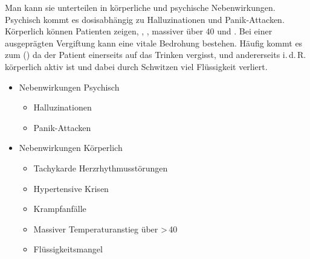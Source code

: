 \TextSlide{\TxSymptome}
{%
Man kann sie unterteilen in
körperliche und psychische Nebenwirkungen.
Psychisch kommt es dosisabhängig zu Halluzinationen und
Panik-Attacken.
Körperlich können Patienten  zeigen, ,
, massiver
 über 40\textdegree{} und
.
Bei einer ausgeprägten Vergiftung kann eine vitale Bedrohung
bestehen. Häufig kommt es zum
() da der
Patient einerseits auf das Trinken vergisst, und
andererseits i.\,d.\,R. körperlich aktiv ist und dabei durch
Schwitzen viel Flüssigkeit verliert.

\vspace{1.5cm}

}{
\begin{itemize}
  \item Nebenwirkungen Psychisch
  \begin{itemize}
    \item Halluzinationen
    \item Panik-Attacken
  \end{itemize}
  \item Nebenwirkungen Körperlich
  \begin{itemize}
    \item Tachykarde Herzrhythmusstörungen
    \item Hypertensive Krisen
    \item Krampfanfälle
    \item Massiver Temperaturanstieg über
    {\textgreater}\,40\DegC*
    \item Flüssigkeitsmangel
  \end{itemize}
\end{itemize}
}{}{}{}




\cite{Supady2009}








\clearpage %
\section{}

